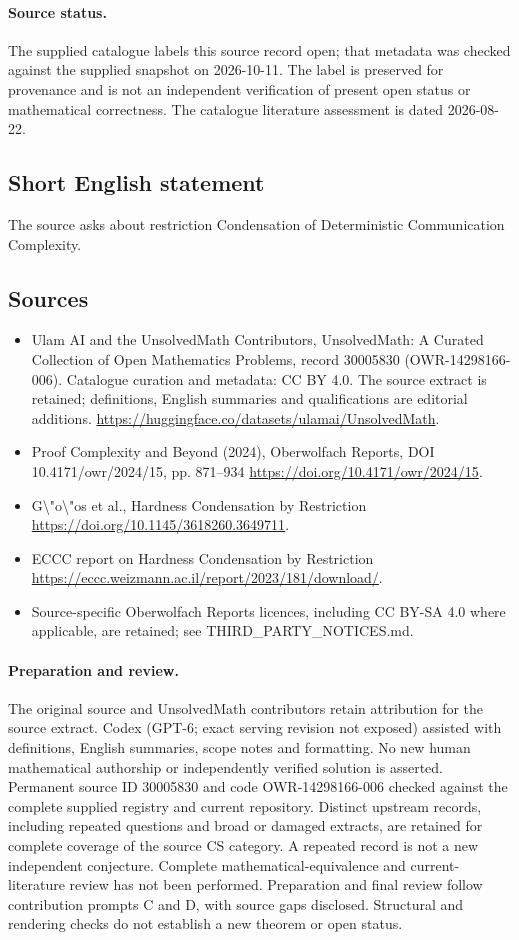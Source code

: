 \documentclass[11pt]{article}
\begin{document}
\paragraph{Source status.}
The supplied catalogue labels this source record open; that metadata was checked against the supplied snapshot on 2026-10-11. The label is preserved for provenance and is not an independent verification of present open status or mathematical correctness. The catalogue literature assessment is dated 2026-08-22.
\subsection{Short English statement}
The source asks about restriction Condensation of Deterministic Communication Complexity.
\subsection{Sources}
\begin{itemize}
\item[S1] Ulam AI and the UnsolvedMath Contributors, UnsolvedMath: A Curated Collection of Open Mathematics Problems, record 30005830 (OWR-14298166-006). Catalogue curation and metadata: CC BY 4.0. The source extract is retained; definitions, English summaries and qualifications are editorial additions.
\url{https://huggingface.co/datasets/ulamai/UnsolvedMath}.
\item[S2] Proof Complexity and Beyond (2024), Oberwolfach Reports, DOI 10.4171/owr/2024/15, pp. 871--934
\url{https://doi.org/10.4171/owr/2024/15}.
\item[S3] G\textbackslash{}"o\textbackslash{}"os et al., Hardness Condensation by Restriction
\url{https://doi.org/10.1145/3618260.3649711}.
\item[S4] ECCC report on Hardness Condensation by Restriction
\url{https://eccc.weizmann.ac.il/report/2023/181/download/}.
\item Source-specific Oberwolfach Reports licences, including CC BY-SA 4.0 where applicable, are retained; see THIRD\_PARTY\_NOTICES.md.
\end{itemize}
\paragraph{Preparation and review.}
The original source and UnsolvedMath contributors retain attribution for the source extract. Codex (GPT-6; exact serving revision not exposed) assisted with definitions, English summaries, scope notes and formatting. No new human mathematical authorship or independently verified solution is asserted. Permanent source ID 30005830 and code OWR-14298166-006 checked against the complete supplied registry and current repository. Distinct upstream records, including repeated questions and broad or damaged extracts, are retained for complete coverage of the source CS category. A repeated record is not a new independent conjecture. Complete mathematical-equivalence and current-literature review has not been performed. Preparation and final review follow contribution prompts C and D, with source gaps disclosed. Structural and rendering checks do not establish a new theorem or open status.
\label{end:30005830}
\end{document}
